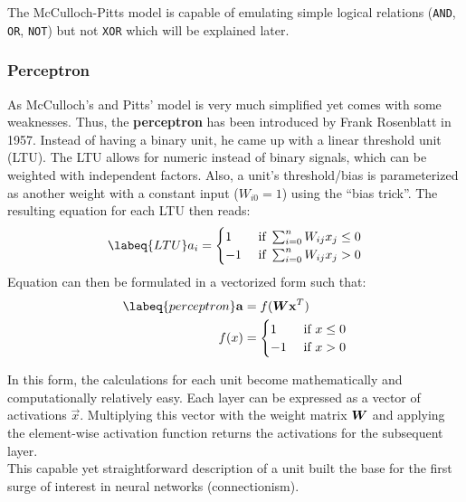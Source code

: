The McCulloch-Pitts model is capable of emulating simple logical relations (\lstinline|AND|, \lstinline|OR|, \lstinline|NOT|) but not \lstinline|XOR| which will be explained later.

\subsubsection{Perceptron}
As McCulloch's and Pitts' model is very much simplified yet comes with some weaknesses.
Thus, the \textbf{perceptron} has been introduced by Frank Rosenblatt in 1957.
Instead of having a binary unit, he came up with a linear threshold unit (LTU).
The LTU allows for numeric instead of binary signals, which can be weighted with independent factors.
Also, a unit's threshold/bias is parameterized as another weight with a constant input ($W_{i0} = 1$) using the ``bias trick''.
The resulting equation for each LTU then reads:
\begin{align}
    \labeq{LTU}
    a_i = \begin{cases}
        1 & \text{ if } \sum_{i=0}^n W_{ij} x_j \leq 0 \\
        -1 & \text{ if } \sum_{i=0}^n W_{ij} x_j > 0
    \end{cases}
\end{align}
Equation  can then be formulated in a vectorized form such that:
\begin{align}
    \labeq{perceptron}
    \vec{a} & = f(\mat{W}\vec{x}^T) \\
    f(x) & = \begin{cases} 1 & \text{ if } x \leq 0 \\  -1 & \text{ if } x > 0 \end{cases}
\end{align}

In this form, the calculations for each unit become mathematically and computationally relatively easy.
Each layer can be expressed as a vector of activations $\vec{x}$.
Multiplying this vector with the weight matrix $\boldsymbol{W}$ and applying the element-wise activation function returns the activations for the subsequent layer.\\
This capable yet straightforward description of a unit built the base for the first surge of interest in neural networks (connectionism).


